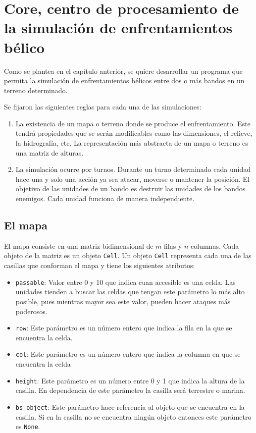 \section{Core, centro de procesamiento de la simulación de enfrentamientos bélico}

Como se plantea en el capítulo anterior, se quiere desarrollar un programa que permita la simulación de enfrentamientos bélicos entre dos o más bandos en un terreno determinado.

Se fijaron las siguientes reglas para cada una de las simulaciones:

\begin{enumerate}
	\item La existencia de un mapa o terreno donde se produce el enfrentamiento. Este tendrá propiedades que se serán modificables como las dimensiones, el relieve, la hidrografía, etc. La representación más abstracta de un mapa o terreno es una matriz de alturas.
	
	\item La simulación ocurre por turnos. Durante un turno determinado cada unidad hace una y solo una acción ya sea atacar, moverse o mantener la posición. El objetivo de las unidades de un bando es destruir las unidades de los bandos enemigos. Cada unidad funciona de manera independiente. 
\end{enumerate}

\subsection{El mapa}

El mapa consiste en una matriz bidimensional de $m$ filas y $n$ columnas. Cada objeto de la matriz es un objeto \verb|Cell|. Un objeto \verb|Cell| representa cada una de las casillas que conforman el mapa y tiene los siguientes atributos:

\begin{itemize}
	\item \verb|passable|: Valor entre 0 y 10 que indica cuan accesible es una celda. Las unidades tienden a buscar las celdas que tengan este parámetro lo más alto posible, pues mientras mayor sea este valor, pueden hacer ataques más poderosos.
	\item \verb|row|: Este parámetro es un número entero que indica la fila en la que se encuentra la celda.
	\item \verb|col|: Este parámetro es un número entero que indica la columna en que se encuentra la celda
	\item \verb|height|: Este parámetro es un número entre 0 y 1 que indica la altura de la casilla. En dependencia de este parámetro la casilla será terrestre o marina.
	\item \verb|bs_object|: Este parámetro hace referencia al objeto que se encuentra en la casilla. Si en la casilla no se encuentra ningún objeto entonces este parámetro es \verb|None|.
\end{itemize}

